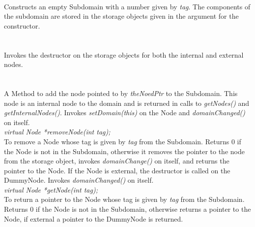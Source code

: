  \\
Constructs an empty Subdomain with a number given by {\em tag}. The
components of the subdomain are stored in the storage objects given in
the argument for the constructor. \\ 

  \\
  \\
Invokes the destructor on the storage objects for both the internal
and external nodes. \\ 


  \\
 \\
A Method to add the node pointed to by {\em theNoedPtr} to the
Subdomain. This node is an internal node to the domain and is
returned in calls to {\em getNodes()} and {\em getInternalNodes()}. 
Invokes {\em setDomain(this)} on the Node and {\em domainChanged()} on
itself.\\ 

{\em virtual Node *removeNode(int tag); } \\
To remove a Node whose tag is given by {\em tag} from the
Subdomain. Returns $0$ if the Node is not in the Subdomain, otherwise
it removes the pointer to the node from the storage object, invokes
{\em domainChange()} on itself, and returns the pointer to the
Node. If the Node is external, the destructor is called on the
DummyNode. Invokes {\em domainChanged()} on itself. \\ 

{\em virtual Node *getNode(int tag); } \\
To return a pointer to the Node whose tag is given by {\em tag} from
the Subdomain. Returns $0$ if the Node is not in the Subdomain,
otherwise returns a pointer to the Node, if external a pointer to the
DummyNode is returned. \\ 

